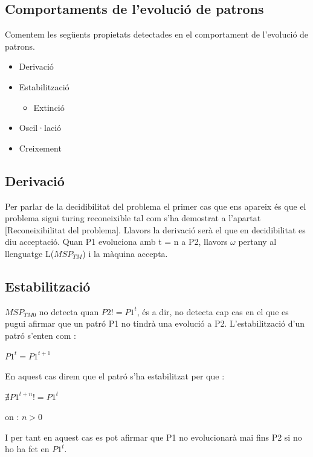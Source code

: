 \documentclass[12pt,a4paper]{report}
\def \w{$\omega$}
\def \tm{$MSP_{TM} $}
\def \tmz{$MSP_{TM0} $}
\begin{document}
\subsection{Comportaments de l’evolució de patrons}

Comentem les següents propietats detectades en el comportament de l’evolució de patrons.

\begin{itemize}
\item Derivació
\item Estabilització
	\begin{itemize}
	\item Extinció
	\end{itemize}
\item Oscil·lació
\item Creixement
\end{itemize}

\subsection{Derivació}

Per parlar de la decidibilitat del problema el primer cas que ens apareix és que el problema sigui turing reconeixible tal com s’ha demostrat a l’apartat [Reconeixibilitat del problema]. Llavors la derivació serà el que en decidibilitat es diu acceptació. Quan P1 evoluciona amb t = n a P2, llavors \w{} pertany al llenguatge L(\tm{}) i la màquina accepta. 

\subsection{Estabilització}

\tmz{} no detecta quan $P2 != P1^t$, és a dir, no detecta cap cas en el que es pugui afirmar que un patró P1 no tindrà una evolució a P2. L’estabilització d’un patró s’enten com :

\begin{center}
$P1^t = P1^{t+1}$
\end{center} 

En aquest cas direm que el patró s’ha estabilitzat per que : 

\begin{center}
$\nexists P1^{t+n} != P1^t$
\end{center} 

on : $n > 0$

I per tant en aquest cas es pot afirmar que P1 no evolucionarà mai fins P2 si no ho ha fet en $P1^t$.
\end{document}
